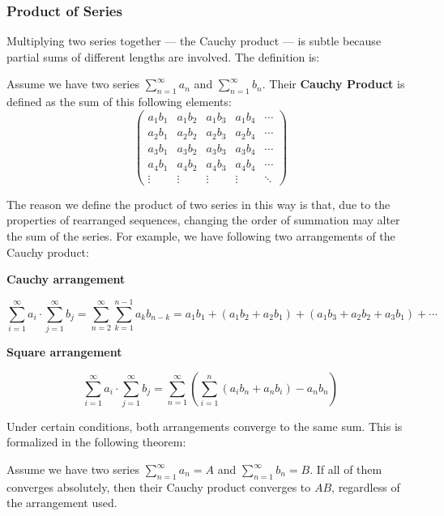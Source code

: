 \subsubsection{Product of Series}
Multiplying two series together — the Cauchy product — is subtle because partial sums of different lengths are involved. The definition is:

\begin{definition}
    Assume we have two series $\sum_{n=1}^{\infty} a_n$ and $\sum_{n=1}^{\infty} b_n$. Their \textbf{Cauchy Product} is defined as the sum of this following elements:
    \[\begin{pmatrix}
        a_1 b_1 & a_1 b_2 & a_1 b_3 & a_1 b_4 & \cdots \\
        a_2 b_1 & a_2 b_2 & a_2 b_3 & a_2 b_4 & \cdots \\
        a_3 b_1 & a_3 b_2 & a_3 b_3 & a_3 b_4 & \cdots \\
        a_4 b_1 & a_4 b_2 & a_4 b_3 & a_4 b_4 & \cdots \\
    \vdots   & \vdots   & \vdots   & \vdots   & \ddots
    \end{pmatrix}\]
\end{definition}

The reason we define the product of two series in this way is that, due to the properties of rearranged sequences, changing the order of summation may alter the sum of the series. For example, we have following two arrangements of the Cauchy product:

\textbf{Cauchy arrangement}

\[
\sum_{i=1}^{\infty} a_i \cdot \sum_{j=1}^{\infty} b_j = \sum_{n=2}^{\infty} \sum_{k=1}^{n-1} a_k b_{n-k} = a_1 b_1 + (a_1 b_2 + a_2 b_1) + (a_1 b_3 + a_2 b_2 + a_3 b_1) + \cdots
\]

\textbf{Square arrangement}

\[
\sum_{i=1}^{\infty} a_i \cdot \sum_{j=1}^{\infty} b_j = \sum_{n=1}^{\infty} \left(\sum_{i=1}^{n}(a_i b_n+ a_n b_i) - a_n b_n \right)
\]

Under certain conditions, both arrangements converge to the same sum. This is formalized in the following theorem:

\begin{theorem}
    Assume we have two series $\sum_{n=1}^{\infty} a_n = A$ and $\sum_{n=1}^{\infty} b_n = B$. If all of them converges absolutely, then their Cauchy product converges to $AB$, regardless of the arrangement used.
\end{theorem}

